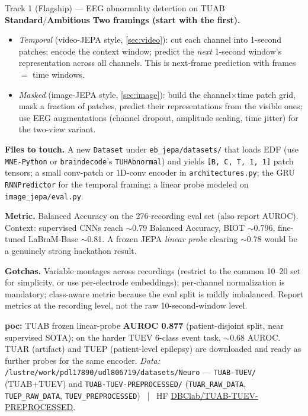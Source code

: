 \documentclass{article}
\newcommand{\code}[1]{\texttt{\small #1}}
\newcommand{\file}[1]{\texttt{\small #1}}
\newcommand{\diffmed}{\colorbox{ebamber!18}{\textcolor{ebamber}{\small\bfseries Standard}}}
\newcommand{\diffhard}{\colorbox{ebred!15}{\textcolor{ebred}{\small\bfseries Ambitious}}}
\begin{document}
\begin{trackbox}{Track 1 (Flagship) --- EEG abnormality detection on TUAB \hfill \diffmed{}/\diffhard{}}
\smallskip
\textbf{Two framings (start with the first).}
\begin{itemize}[leftmargin=1.4em,itemsep=1pt,topsep=2pt]
  \item \emph{Temporal} (video-JEPA style, \cref{sec:video}): cut each channel into
    1-second patches; encode the context window; predict the \emph{next} 1-second
    window's representation across all channels. This is next-frame prediction with
    frames $=$ time windows.
  \item \emph{Masked} (image-JEPA style, \cref{sec:image}): build the
    channel$\times$time patch grid, mask a fraction of patches, predict their
    representations from the visible ones; use EEG augmentations (channel dropout,
    amplitude scaling, time jitter) for the two-view variant.
\end{itemize}

\smallskip
\textbf{Files to touch.} A new \code{Dataset} under \file{eb\_jepa/datasets/} that
loads EDF (use \code{MNE-Python} or \code{braindecode}'s \code{TUHAbnormal}) and
yields \code{[B, C, T, 1, 1]} patch tensors; a small conv-patch or 1D-conv encoder
in \file{architectures.py}; the GRU \code{RNNPredictor} for the temporal framing; a
linear probe modeled on \file{image\_jepa/eval.py}.

\smallskip
\textbf{Metric.} Balanced Accuracy on the 276-recording eval set (also report
AUROC). Context: supervised CNNs reach $\sim$0.79 Balanced Accuracy, BIOT
$\sim$0.796, fine-tuned LaBraM-Base $\sim$0.81. A frozen JEPA \emph{linear probe}
clearing $\sim$0.78 would be a genuinely strong hackathon result.

\smallskip
\textbf{Gotchas.} Variable montages across recordings (restrict to the common 10--20
set for simplicity, or use per-electrode embeddings); per-channel normalization is
mandatory; class-aware metric because the eval split is mildly imbalanced. Report
metrics at the recording level, not the raw 10-second-window level.

\smallskip
\textbf{poc:} TUAB frozen linear-probe \textbf{AUROC 0.877} (patient-disjoint split,
near supervised SOTA); on the harder TUEV 6-class event task, $\sim$0.68 AUROC.
TUAR (artifact) and TUEP (patient-level epilepsy) are downloaded and ready as further
probes for the same encoder.
\emph{Data:} \code{/lustre/work/pdl17890/udl806719/datasets/Neuro} ---
\code{TUAB-TUEV/} (TUAB+TUEV) and \code{TUAB-TUEV-PREPROCESSED/}
(\code{TUAR\_RAW\_DATA}, \code{TUEP\_RAW\_DATA}, \code{TUEV\_PREPROCESSED}) ~|~ HF
\href{https://huggingface.co/datasets/DBClab/TUAB-TUEV-PREPROCESSED}{DBClab/TUAB-TUEV-PREPROCESSED}.
\end{trackbox}
\end{document}
